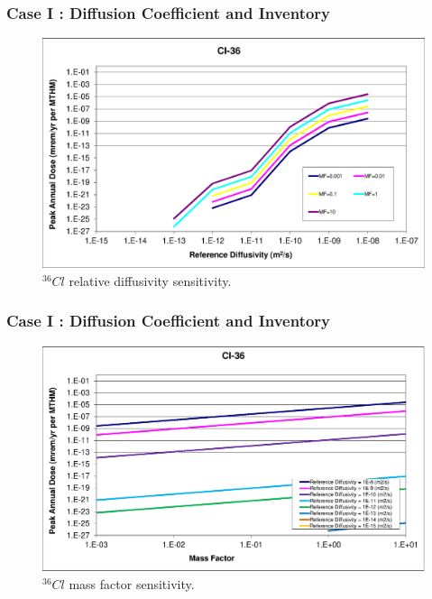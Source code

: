 \begin{frame}[c]
  \frametitle{Case I : Diffusion Coefficient and Inventory}

\begin{figure}[ht]
\centering
\includegraphics[width=\linewidth]{DiffCoeffAndInvEBSFail/Cl-36.eps}
\caption{$^{36}Cl$ relative diffusivity sensitivity.}
\label{fig:DCInvCl36}
\end{figure}
\end{frame}

\begin{frame}[c]
  \frametitle{Case I : Diffusion Coefficient and Inventory}

\begin{figure}[ht]
\centering
\includegraphics[width=\linewidth]{DiffCoeffAndInvEBSFail/Cl-36-MF.eps}
\caption{$^{36}Cl$ mass factor sensitivity.}
\label{fig:DCInvCl36MF}
\end{figure}
\end{frame}


